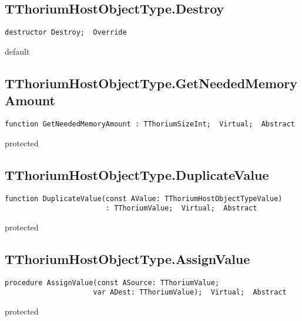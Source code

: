 \subsection{TThoriumHostObjectType.Destroy}
\label{thoriumcore:thorium:tthoriumhostobjecttype:destroy}
\begin{FPCList}
\Synopsis
\Declaration 

\begin{verbatim}
destructor Destroy;  Override
\end{verbatim}
\Visibility
default
\Description
\Errors
\end{FPCList}
\subsection{TThoriumHostObjectType.GetNeededMemoryAmount}
\label{thoriumcore:thorium:tthoriumhostobjecttype:getneededmemoryamount}
\begin{FPCList}
\Synopsis
\Declaration 

\begin{verbatim}
function GetNeededMemoryAmount : TThoriumSizeInt;  Virtual;  Abstract
\end{verbatim}
\Visibility
protected
\Description
\Errors
\end{FPCList}
\subsection{TThoriumHostObjectType.DuplicateValue}
\label{thoriumcore:thorium:tthoriumhostobjecttype:duplicatevalue}
\begin{FPCList}
\Synopsis
\Declaration 

\begin{verbatim}
function DuplicateValue(const AValue: TThoriumHostObjectTypeValue)
                        : TThoriumValue;  Virtual;  Abstract
\end{verbatim}
\Visibility
protected
\Description
\Errors
\end{FPCList}
\subsection{TThoriumHostObjectType.AssignValue}
\label{thoriumcore:thorium:tthoriumhostobjecttype:assignvalue}
\begin{FPCList}
\Synopsis
\Declaration 

\begin{verbatim}
procedure AssignValue(const ASource: TThoriumValue;
                     var ADest: TThoriumValue);  Virtual;  Abstract
\end{verbatim}
\Visibility
protected
\Description
\Errors
\end{FPCList}
